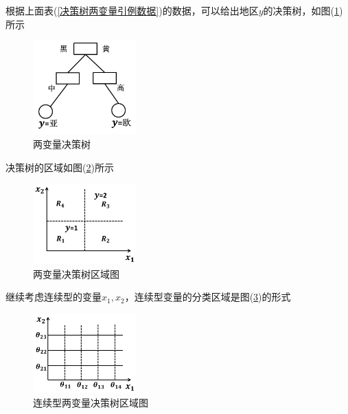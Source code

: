         根据上面表(\ref{决策树两变量引例数据})的数据，可以给出地区$y$的决策树，如图(\ref{fig:两变量决策树})所示
                \begin{figure}[H]
                \centering
                \includegraphics[width=4cm]{images/two_variate_tree.jpg}
                \caption{两变量决策树}
                \label{fig:两变量决策树}
                \end{figure}
        决策树的区域如图(\ref{fig:两变量决策树区域图})所示
                \begin{figure}[H]
                \centering
                \includegraphics[width=4cm]{images/two_variate_tree_area.jpg}
                \caption{两变量决策树区域图}
                \label{fig:两变量决策树区域图}
                \end{figure}
        继续考虑连续型的变量$x_1,x_2$，连续型变量的分类区域是图(\ref{fig:连续型两变量决策树区域图})的形式
                \begin{figure}[H]
                \centering
                \includegraphics[width=4cm]{images/continuous_two_variate_tree_area.jpg}
                \caption{连续型两变量决策树区域图}
                \label{fig:连续型两变量决策树区域图}
                \end{figure}
        \par
